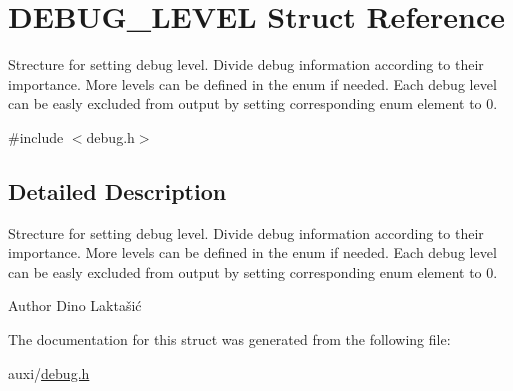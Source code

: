 \hypertarget{structDEBUG__LEVEL}{}\section{D\+E\+B\+U\+G\+\_\+\+L\+E\+V\+EL Struct Reference}
\label{structDEBUG__LEVEL}


Strecture for setting debug level. Divide debug information according to their importance. More levels can be defined in the enum if needed. Each debug level can be easly excluded from output by setting corresponding enum element to 0.  




{\ttfamily \#include $<$debug.\+h$>$}



\subsection{Detailed Description}
Strecture for setting debug level. Divide debug information according to their importance. More levels can be defined in the enum if needed. Each debug level can be easly excluded from output by setting corresponding enum element to 0. 

\begin{DoxyAuthor}{Author}
Dino Laktašić 
\end{DoxyAuthor}


The documentation for this struct was generated from the following file\+:\begin{DoxyCompactItemize}
\item 
auxi/\hyperlink{debug_8h}{debug.\+h}\end{DoxyCompactItemize}
